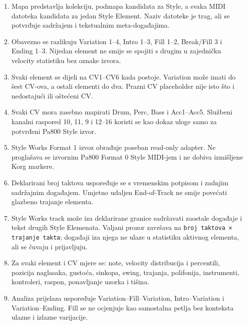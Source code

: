\documentclass[11pt]{article}
\begin{document}
\begin{enumerate}[label=S\arabic*.]
    \item Mapa predstavlja kolekciju, podmapa kandidata za Style, a svaka MIDI
    datoteka kandidata za jedan Style Element. Naziv datoteke je trag, ali se
    potvrđuje sadržajem i tekstualnim meta-događajima.

    \item Obavezno se razlikuju Variation 1--4, Intro 1--3, Fill 1--2,
    Break/Fill 3 i Ending 1--3. Nijedan element ne smije se spojiti s drugim u
    zajedničku velocity statistiku bez oznake izvora.

    \item Svaki element se dijeli na CV1--CV6 kada postoje. Variation može imati
    do šest CV-ova, a ostali elementi do dva. Prazni CV placeholder nije isto
    što i nedostajući ili oštećeni CV.

    \item Svaki CV mora zasebno mapirati Drum, Perc, Bass i Acc1--Acc5. Službeni
    kanalni raspored 10, 11, 9 i 12--16 koristi se kao dokaz uloge samo za
    potvrđeni Pa800 Style izvor.

    \item Style Works Format 1 izvoz obrađuje poseban read-only adapter. Ne
    proglašava se izvornim Pa800 Format 0 Style MIDI-jem i ne dobiva izmišljene
    Korg markere.

    \item Deklarirani broj taktova uspoređuje se s vremenskim potpisom i zadnjim
    sadržajnim događajem. Umjetno udaljen End-of-Track ne smije povećati
    glazbeno trajanje elementa.

    \item Style Works track može iza deklarirane granice sadržavati zaostale
    događaje i tekst drugih Style Elemenata. Valjani prozor završava na
    \texttt{broj taktova × trajanje takta}; događaji iza njega ne ulaze u
    statistiku aktivnog elementa, ali se čuvaju i prijavljuju.

    \item Za svaki element i CV mjere se: note, velocity distribucija i
    percentili, pozicija naglasaka, gustoća, sinkopa, swing, trajanja,
    polifonija, instrumenti, kontroleri, raspon, ponavljanje uzorka i tišina.

    \item Analiza prijelaza uspoređuje Variation--Fill--Variation,
    Intro--Variation i Variation--Ending. Fill se ne ocjenjuje kao samostalna
    petlja bez konteksta ulazne i izlazne varijacije.


\end{enumerate}
\end{document}

